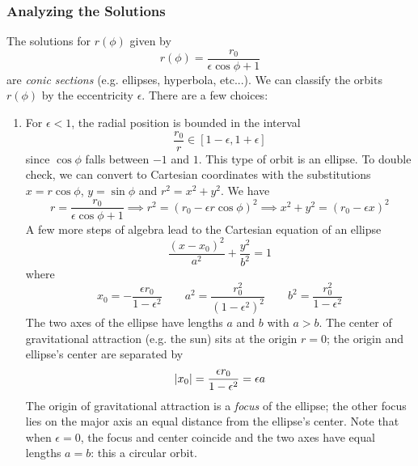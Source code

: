 \documentclass[11pt, a4paper]{article}
\begin{document}
\subsubsection{Analyzing the Solutions}
The solutions for $ r(\phi) $ given by
\begin{equation*}
	r(\phi) = \frac{r_{0}}{\epsilon \cos \phi + 1}
\end{equation*}
are \textit{conic sections} (e.g. ellipses, hyperbola, etc...). We can classify the orbits $ r(\phi) $ by the eccentricity $ \epsilon $. There are a few choices:
\begin{enumerate}
	\item For $ \epsilon < 1 $, the radial position is bounded in the interval 
	\begin{equation*}
		\frac{r_{0}}{r} \in [1 - \epsilon, 1 + \epsilon]
	\end{equation*}
	since $ \cos \phi $ falls between $ -1 $ and $ 1 $. This type of orbit is an ellipse. To double check, we can convert to Cartesian coordinates with the substitutions $ x = r \cos \phi $, $ y = \sin \phi $  and $ r^{2} = x^{2} + y^{2} $. We have
	\begin{equation*}
		r = \frac{r_{0}}{\epsilon \cos \phi + 1} \implies r^{2} = (r_{0} - \epsilon r \cos \phi)^{2} \implies x^{2} + y^{2} = (r_{0} - \epsilon x)^{2}
	\end{equation*}
	A few more steps of algebra lead to the Cartesian equation of an ellipse
	\begin{equation*}
		\frac{(x - x_{0})^{2}}{a^{2}} + \frac{y^{2}}{b^{2}} = 1
	\end{equation*}
	where 
	\begin{equation*}
		x_{0} = - \frac{\epsilon r_{0}}{1 - \epsilon^{2}} \qquad a^{2} = \frac{r_{0}^{2}}{(1 - \epsilon^{2})^{2}} \qquad b^{2} = \frac{r_{0}^{2}}{1 - \epsilon^{2}}
	\end{equation*}
	The two axes of the ellipse have lengths $ a $ and $ b $ with $ a > b $. The center of gravitational attraction (e.g. the sun) sits at the origin $ r = 0 $; the origin and ellipse's center are separated by
	\begin{equation*}
		\abs{x_{0}} = \frac{\epsilon r_{0}}{1 - \epsilon^{2}} = \epsilon a
	\end{equation*}
	The origin of gravitational attraction is a \textit{focus} of the ellipse; the other focus lies on the major axis an equal distance from the ellipse's center. Note that when $ \epsilon = 0 $, the focus and center coincide and the two axes have equal lengths $ a = b $: this a circular orbit.
	

\end{enumerate}
\end{document}
